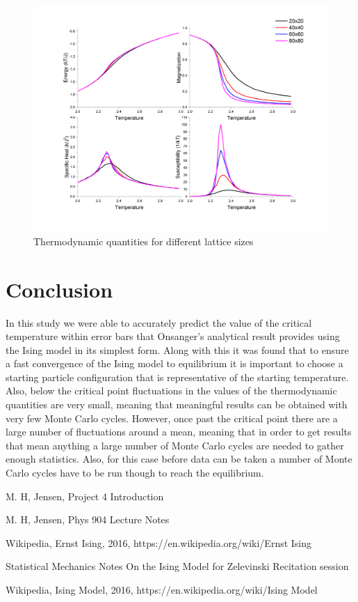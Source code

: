 \documentclass[12pt,righttag]{article}
\begin{document}
			\begin{figure}
				
				\includegraphics[width=6in]{Awesomegraph.png}
				
				
				
				\caption{\label{Thermo} Thermodynamic quantities for different lattice sizes }
			\end{figure}
		
		
		
		
		
\section{Conclusion}
In this study we were able to accurately predict the value of the critical temperature within error bars that Onsanger's analytical result provides using the Ising model in its simplest form. Along with this it was found that to ensure a fast convergence of the Ising model to equilibrium it is important to choose a starting particle configuration that is representative of the starting temperature. Also, below the critical point fluctuations in the values of the thermodynamic quantities are very small, meaning that meaningful results can be obtained with very few Monte Carlo cycles. However, once past the critical point there are a large number of fluctuations around a mean, meaning that in order to get results that mean anything a large number of Monte Carlo cycles are needed to gather enough statistics. Also, for this case before data can be taken a number of Monte Carlo cycles have to be run though to reach the equilibrium.

 
\begin{thebibliography}{9}
	M. H, Jensen, Project 4 Introduction
	
	M. H, Jensen, Phys 904 Lecture Notes
	
	Wikipedia, Ernst Ising, 2016, https://en.wikipedia.org/wiki/Ernst Ising 
	
	Statistical Mechanics Notes On the Ising Model for Zelevinski Recitation session
	
	Wikipedia, Ising Model, 2016, https://en.wikipedia.org/wiki/Ising Model
	
\end{thebibliography}
\end{document}
